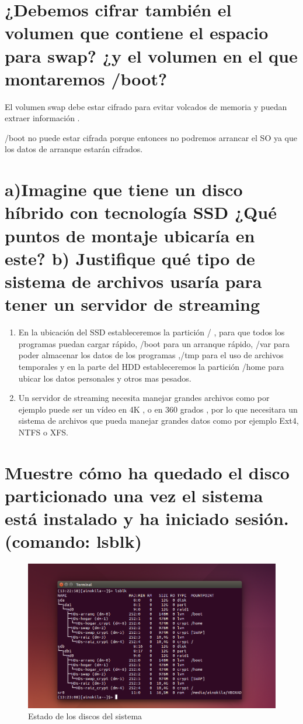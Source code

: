 \section{¿Debemos cifrar también el volumen que contiene el espacio	para swap? ¿y el volumen en el que montaremos /boot?}

El volumen swap debe estar cifrado para evitar volcados de memoria y puedan extraer información . 

/boot no puede estar cifrada porque entonces no podremos arrancar el SO ya que los datos de arranque estarán cifrados.

\section{a)Imagine que tiene un disco híbrido con tecnología SSD ¿Qué puntos de montaje ubicaría en este? b) Justifique qué tipo de sistema de archivos usaría para tener un servidor de streaming}

\begin{enumerate}[label=(\alph*)]
	\item En la ubicación del SSD estableceremos la partición / , para que todos los programas puedan cargar rápido, /boot para un arranque rápido, /var para poder almacenar los datos de los programas ,/tmp para el uso de archivos temporales y en la parte del HDD estableceremos la partición /home para ubicar los datos personales y otros mas pesados.
	\item Un servidor de streaming necesita manejar grandes archivos como por ejemplo puede ser un vídeo en 4K , o en 360 grados , por lo que necesitara un sistema de archivos que pueda manejar grandes datos como por ejemplo Ext4, NTFS o XFS.
\end{enumerate}

\section{Muestre cómo ha quedado el disco particionado una vez el sistema está instalado y ha iniciado sesión. (comando: lsblk)}

	\begin{figure}[H] %
		\centering
		\includegraphics[scale=0.5]{pics/Captura10.png}  %
		\caption{Estado de los discos del sistema} \label{fig:figura10}
	\end{figure}

